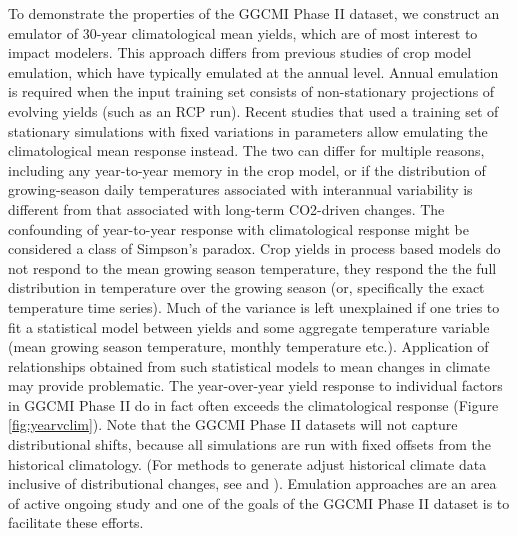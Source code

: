 \documentclass[preprint, 5p, times, twocolumn]{elsarticle}
\begin{document}

To demonstrate the properties of the GGCMI Phase II dataset, we construct an emulator of 30-year climatological mean yields, which are of most interest to impact modelers. This approach differs from previous studies of crop model emulation, which have typically emulated at the annual level. Annual emulation is required when the input training set consists of non-stationary projections of evolving yields (such as an RCP run). Recent studies \citep[e.g.][]{FRONZEK20182, Snyder2018} that used a training set of stationary simulations with fixed variations in parameters allow emulating the climatological mean response instead. The two can differ for multiple reasons, including any year-to-year memory in the crop model, or if the distribution of growing-season daily temperatures associated with interannual variability is different from that associated with long-term CO2-driven changes. The confounding of year-to-year response with climatological response might be considered a class of Simpson's paradox. Crop yields in process based models do not respond to the mean growing season temperature, they respond the the full distribution in temperature over the growing season (or, specifically the exact temperature time series). Much of the variance is left unexplained if one tries to fit a statistical model between yields and some aggregate temperature variable (mean growing season temperature, monthly temperature etc.). Application of relationships obtained from such statistical models to mean changes in climate may provide problematic. The year-over-year yield response to individual factors in GGCMI Phase II do in fact often exceeds the climatological response (Figure \ref{fig:yearvclim}). Note that the GGCMI Phase II datasets will not capture distributional shifts, because all simulations are run with fixed offsets from the historical climatology. (For methods to generate adjust historical climate data inclusive of distributional changes, see \cite{Haugen2018} and \cite{poppick2016}). Emulation approaches are an area of active ongoing study and one of the goals of the GGCMI Phase II dataset is to facilitate these efforts. 
\end{document}

